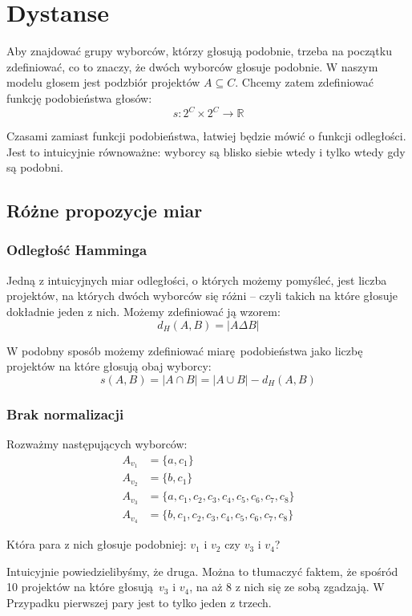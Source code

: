\documentclass{article}
\begin{document}
\section{Dystanse}

Aby znajdować grupy wyborców, którzy głosują podobnie, trzeba na początku
zdefiniować, co to znaczy, że dwóch wyborców głosuje podobnie. W naszym modelu
głosem jest podzbiór projektów $A \subseteq C$. Chcemy zatem zdefiniować
funkcję podobieństwa głosów:
\[ s : 2^C \times 2^C \to \mathbb{R} \]

Czasami zamiast funkcji podobieństwa, łatwiej będzie mówić o funkcji
odległości. Jest to intuicyjnie równoważne: wyborcy są blisko siebie wtedy i
tylko wtedy gdy są podobni.

\subsection{Różne propozycje miar}

\subsubsection{Odległość Hamminga}

Jedną z intuicyjnych miar odległości, o których możemy pomyśleć, jest liczba
projektów, na których dwóch wyborców się różni -- czyli takich na które głosuje
dokładnie jeden z nich. Możemy zdefiniować ją wzorem:
\[ d_H(A,B) = |A \Delta B| \]

W podobny sposób możemy zdefiniować miarę podobieństwa jako liczbę projektów
na które głosują obaj wyborcy:
\[ s(A,B) = |A \cap B| = |A \cup B| - d_H(A,B) \]

\subsubsection*{Brak normalizacji}

Rozważmy następujących wyborców:
\begin{align*}
  A_{v_1} &= \{ a, c_1 \} \\
  A_{v_2} &= \{ b, c_1 \} \\
  A_{v_3} &= \{ a, c_1, c_2, c_3, c_4, c_5, c_6, c_7, c_8 \} \\
  A_{v_4} &= \{ b, c_1, c_2, c_3, c_4, c_5, c_6, c_7, c_8 \}
\end{align*}

Która para z nich głosuje podobniej: $v_1$ i $v_2$ czy $v_3$ i $v_4$?

Intuicyjnie powiedzielibyśmy, że druga. Można to tłumaczyć faktem, że spośród
10 projektów na które głosują $v_3$ i $v_4$, na aż 8 z nich się ze sobą
zgadzają. W Przypadku pierwszej pary jest to tylko jeden z trzech.
\end{document}
